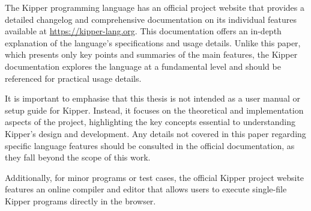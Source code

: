 
The Kipper programming language has an official project website that provides a detailed changelog and comprehensive documentation on its individual features available at \url{https://kipper-lang.org}. This documentation offers an in-depth explanation of the language’s specifications and usage details. Unlike this paper, which presents only key points and summaries of the main features, the Kipper documentation explores the language at a fundamental level and should be referenced for practical usage details.

It is important to emphasise that this thesis is not intended as a user manual or setup guide for Kipper. Instead, it focuses on the theoretical and implementation aspects of the project, highlighting the key concepts essential to understanding Kipper’s design and development. Any details not covered in this paper regarding specific language features should be consulted in the official documentation, as they fall beyond the scope of this work.

Additionally, for minor programs or test cases, the official Kipper project website features an online compiler and editor that allows users to execute single-file Kipper programs directly in the browser.

